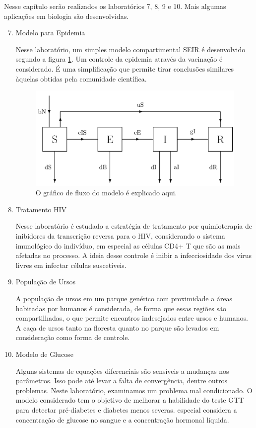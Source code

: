 Nesse capítulo serão realizados os laboratórios 7, 8, 9 e 10. Mais algumas
aplicações em biologia são desenvolvidas.

\begin{enumerate}[label=\textbf{Lab \arabic*:}]
    \setcounter{enumi}{6}

    \item Modelo para Epidemia 
    
    Nesse laboratório, um simples modelo compartimental SEIR é desenvolvido
    segundo a figura \ref{fig1:seir}. Um controle da epidemia através da
    vacinação é considerado. É uma simplificação que permite tirar conclusões
    similares àquelas obtidas pela comunidade científica. 

    \begin{figure}[hb]
        \center
        \includegraphics[width = \textwidth]{../images/flow-chat-seir.png}
        \caption{O gráfico de fluxo do modelo é explicado aqui.}
        \label{fig1:seir}
    \end{figure}

    \item Tratamento HIV
    
    Nesse laboratório é estudado a estratégia de tratamento por quimioterapia
    de inibidores da transcrição reversa para o HIV, considerando o sistema
    imunológico do indivíduo, em especial as células CD4+ T que são as mais
    afetadas no processo. A ideia desse controle é inibir a infecciosidade dos
    vírus livres em infectar células suscetíveis. 
    
    \item População de Ursos

    A população de ursos em um parque genérico com proximidade a áreas
    habitadas por humanos é considerada, de forma que essas regiões são
    compartilhadas, o que permite encontros indesejados entre ursos e humanos.
    A caça de ursos tanto na floresta quanto no parque são levados em
    consideração como forma de controle. 

    \item Modelo de Glucose 
    
    Alguns sistemas de equações diferenciais são sensíveis a mudanças nos
    parâmetros. Isso pode até levar a falta de convergência, dentre outros
    problemas. Neste laboratório, examinamos um problema mal condicionado. O
    modelo considerado tem o objetivo de melhorar a habilidade do teste GTT
    para detectar pré-diabetes e diabetes menos severas. especial considera a
    concentração de glucose no sangue e a concentração hormonal líquida. 
 
\end{enumerate}